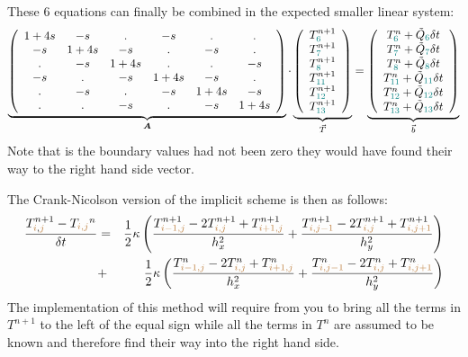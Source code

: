 These 6 equations can finally be combined in the expected smaller linear system:
\begin{equation}
\underbrace{
\left(
\begin{array}{cccccc}
1+4s & -s & . & -s & . & . \\
-s & 1+4s & -s & . & -s & . \\
. & -s & 1+4s & . & . & -s \\ 
-s & . & -s & 1+4s & -s & . \\
. & -s & . & -s & 1+4s & -s \\
. & . & -s & . & -s & 1+4s 
\end{array}
\right)
}_{\bm A}
\cdot
\underbrace{
\left(
\begin{array}{c}
T_{{\color{teal}6}}^{n+1} \\ 
T_{{\color{teal}7}}^{n+1} \\ 
T_{{\color{teal}8}}^{n+1} \\ 
T_{{\color{teal}11}}^{n+1} \\ 
T_{{\color{teal}12}}^{n+1} \\ 
T_{{\color{teal}13}}^{n+1} 
\end{array}
\right)
}_{\vec T}
=
\underbrace{
\left(
\begin{array}{c}
T_{{\color{teal}6}}^n + \tilde{Q}_{\color{teal}6}\delta t \\ 
T_{{\color{teal}7}}^n + \tilde{Q}_{\color{teal}7} \delta t\\ 
T_{{\color{teal}8}}^n + \tilde{Q}_{\color{teal}8} \delta t\\ 
T_{{\color{teal}11}}^n + \tilde{Q}_{\color{teal}11} \delta t\\ 
T_{{\color{teal}12}}^n + \tilde{Q}_{\color{teal}12} \delta t\\ 
T_{{\color{teal}13}}^n + \tilde{Q}_{\color{teal}13} \delta t
\end{array}
\right)
}_{\vec b}
\end{equation}
Note that is the boundary values had not been zero they would have found their way to the right hand side 
vector.

The Crank-Nicolson version of the implicit scheme is then as follows:
\begin{eqnarray}
\frac{T_{{\color{brown}i},{\color{brown}j}}^{n+1}-T_{\color{brown}i,j}^n}{\delta t}
&=& \frac12 \kappa
\left(
\frac{ T_{{\color{brown}i-1,j}}^{n+1}-2T_{{\color{brown}i,j}}^{n+1}+T_{{\color{brown}i+1,j}}^{n+1} }{h_x^2} + 
\frac{ T_{{\color{brown}i,j-1}}^{n+1}-2T_{{\color{brown}i,j}}^{n+1}+T_{{\color{brown}i,j+1}}^{n+1} }{h_y^2}
\right) \nonumber\\
&+& \frac12 \kappa
\left(
\frac{ T_{{\color{brown}i-1,j}}^{n}-2T_{{\color{brown}i,j}}^{n}+T_{{\color{brown}i+1,j}}^{n} }{h_x^2} + 
\frac{ T_{{\color{brown}i,j-1}}^{n}-2T_{{\color{brown}i,j}}^{n}+T_{{\color{brown}i,j+1}}^{n} }{h_y^2}
\right) 
\end{eqnarray}
The implementation of this method will require from you to bring 
all the terms in $T^{n+1}$ to the left of the equal sign 
while all the terms in $T^n$ are assumed to be known and therefore find their way into
the right hand side. 

